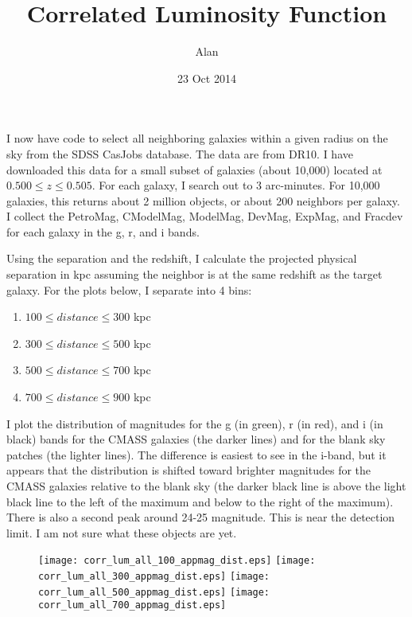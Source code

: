 \documentclass[10pt]{article}
\title{Correlated Luminosity Function}
\author{Alan}
\date{23 Oct 2014}
\begin{document}
\maketitle

I now have code to select all neighboring galaxies within a given radius on the sky from the SDSS CasJobs database. The data are from DR10.
I have downloaded this data for a small subset of galaxies (about 10,000) located at $0.500\leq z \leq 0.505$. For each galaxy, I search out to 
3 arc-minutes. For 10,000 galaxies, this returns about 2 million objects, or about 200 neighbors per galaxy. I collect the PetroMag, CModelMag, ModelMag, 
DevMag, ExpMag, and Fracdev for each galaxy in the g, r, and i bands.

Using the separation and the redshift, I calculate the projected physical separation in kpc assuming the neighbor is at the same redshift as the target 
galaxy. For the plots below, I separate into 4 bins: 
\begin{enumerate}
 \item $100\leq distance \leq 300$ kpc
 \item $300\leq distance \leq 500$ kpc
 \item $500\leq distance \leq 700$ kpc
 \item $700\leq distance \leq 900$ kpc
\end{enumerate}
I plot the distribution of magnitudes for the g (in green), r (in red), and i (in black) bands for the CMASS galaxies (the darker lines) and for the blank
sky patches (the lighter lines). The difference is easiest to see in the i-band, but it appears that the distribution is shifted toward brighter magnitudes
for the CMASS galaxies relative to the blank sky (the darker black line is above the light black line to the left of the maximum and below to the right 
of the maximum). There is also a second peak around 24-25 magnitude. This is near the detection limit. I am not sure what these objects are yet.


\begin{figure}
 \texttt{[image: corr\_lum\_all\_100\_appmag\_dist.eps]}
 \texttt{[image: corr\_lum\_all\_300\_appmag\_dist.eps]}
 \texttt{[image: corr\_lum\_all\_500\_appmag\_dist.eps]}
 \texttt{[image: corr\_lum\_all\_700\_appmag\_dist.eps]}
\end{figure}
\end{document}
